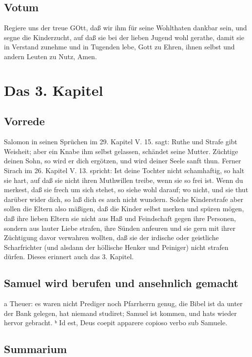 \section{Votum}

Regiere uns der treue GOtt, daß wir ihm für seine Wohlthaten dankbar sein, und segne die Kinderzucht, auf daß sie bei der lieben Jugend wohl gerathe, damit sie in Verstand zunehme und in Tugenden lebe, Gott zu Ehren, ihnen selbst und andern Leuten zu Nutz, Amen.

\chapter{Das 3. Kapitel}

\section{Vorrede}

Salomon in seinen Sprüchen im 29. Kapitel V. 15. sagt: Ruthe und Strafe gibt Weisheit; aber ein Knabe ihm selbst gelassen, schändet seine Mutter. Züchtige deinen Sohn, so wird er dich ergötzen, und wird deiner Seele sanft thun. Ferner Sirach im 26. Kapitel V. 13. spricht: Ist deine Tochter nicht schamhaftig, so halt sie hart, auf daß sie nicht ihren Muthwillen treibe, wenn sie so frei ist. Wenn du merkest, daß sie frech um sich stehet, so siehe wohl darauf; wo nicht, und sie thut darüber wider dich, so laß dich es auch nicht wundern. Solche Kinderstrafe aber sollen die Eltern also mäßigen, daß die Kinder selbst merken und spüren mögen, daß ihre lieben Eltern sie nicht aus Haß und Feindschaft gegen ihre Personen, sondern aus lauter Liebe strafen, ihre Sünden anfeuren und sie gern mit ihrer Züchtigung davor verwahren wollten, daß sie der irdische oder geistliche Scharfrichter (und alsdann der höllische Henker und Peiniger) nicht strafen dürfen. Dieses erinnert auch das 3. Kapitel.

\section{Samuel wird berufen und ansehnlich gemacht}

a Theuer: es waren nicht Prediger noch Pfarrherrn genug, die Bibel ist da unter der Bank gelegen, hat niemand studiret; Samuel ist kommen, und hats wieder hervor gebracht.
ᵇ Id est, Deus coepit apparere copioso verbo sub Samuele.

\section{Summarium}

